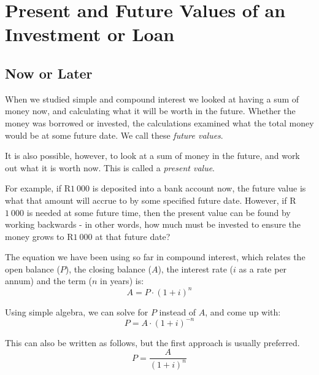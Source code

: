 \section{Present and Future Values of an Investment or Loan}
\label{sec:m:f11:presentfuture}

\subsection{Now or Later}
When we studied simple and compound interest we looked at having a sum of money now, and calculating what it will be worth in the future. Whether the money was borrowed or invested, the calculations examined what the total money would be at some future date. We call these \textit{future values}.

It is also possible, however, to look at a sum of money in the future, and work out what it is worth now. This is called a \textit{present value}.

For example, if R$1~000$ is deposited into a bank account now, the future value is what that amount will accrue to by some specified future date. However, if R$1~000$ is needed at some future time, then the present value can be found by working backwards - in other words, how much must be invested to ensure the money grows to R$1~000$ at that future date?

The equation we have been using so far in compound interest, which relates the open balance ($P$), the closing balance ($A$), the interest rate ($i$ as a rate per annum) and the term ($n$ in years) is:
\begin{equation}
A = P \cdot (1+i)^n
\label{m:f:closing}
\end{equation}

Using simple algebra, we can solve for $P$ instead of $A$, and come up with:
\begin{equation}
P = A \cdot (1+i)^{-n}
\label{m:f:opening}
\end{equation}

This can also be written as follows, but the first approach is usually preferred.
\begin{equation}
P = \frac{A}{(1+i)^n}
\label{m:f:opening2}
\end{equation}

